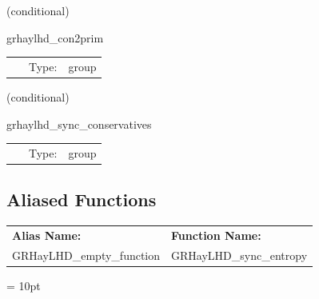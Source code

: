 \documentclass{article}
\begin{document}
\vspace{5mm}

   (conditional) 

\hspace{5mm} grhaylhd\_con2prim 

\hspace{5mm}{\it compute primitive variables from conservatives } 


\hspace{5mm}

 \begin{tabular*}{160mm}{cll} 
~ & Type:  & group \\ 
\end{tabular*} 


\vspace{5mm}

   (conditional) 

\hspace{5mm} grhaylhd\_sync\_conservatives 

\hspace{5mm}{\it sync allocated conservative variable ghost zones for c2p } 


\hspace{5mm}

 \begin{tabular*}{160mm}{cll} 
~ & Type:  & group \\ 
\end{tabular*} 


\subsection*{Aliased Functions}

\hspace{5mm}

 \begin{tabular*}{160mm}{ll} 

{\bf Alias Name:} ~~~~~~~ & {\bf Function Name:} \\ 
GRHayLHD\_empty\_function & GRHayLHD\_sync\_entropy \\ 
\end{tabular*} 



\vspace{5mm}\parskip = 10pt 
\end{document}
